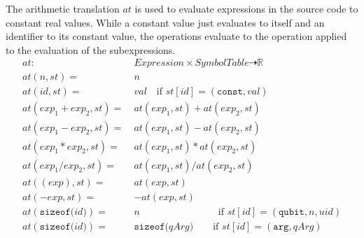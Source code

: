 The arithmetic translation $at$ is used to evaluate expressions in the source code to constant real values. While a constant value just evaluates to itself and an identifier to its constant value, the operations evaluate to the operation applied to the evaluation of the subexpressions.
\begin{align*}
    at : \ & Expression \times SymbolTable \dashrightarrow \mathbb{R}\\
    at(n, st) = \ & n\\
    at(id, st) = \ & val \quad \text{if } st[id] = (\texttt{const}, val)\\
    at(exp_1 + exp_2, st) = \ & at(exp_1, st) + at(exp_2, st)\\
    at(exp_1 - exp_2, st) = \ & at(exp_1, st) - at(exp_2, st)\\
    at(exp_1 * exp_2, st) = \ & at(exp_1, st) * at(exp_2, st)\\
    at(exp_1 / exp_2, st) = \ & at(exp_1, st) / at(exp_2, st)\\
    at((exp), st) = \ & at(exp, st)\\
    at(-exp, st) = \ & -at(exp, st)\\
    at(\texttt{sizeof(} id \texttt{)}) = \ & n \hspace{8em} \text{if } st[id] = (\texttt{qubit}, n, uid)\\
    at(\texttt{sizeof(} id \texttt{)}) = \ & \texttt{sizeof(} qArg \texttt{)} \texttt \quad \quad \text{if } st[id] = (\texttt{arg}, qArg)
\end{align*}

